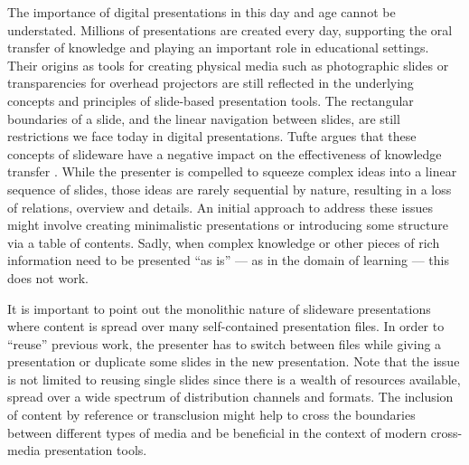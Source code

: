 
    The importance of digital presentations in this day and age cannot be
    understated. Millions of presentations are created every day, supporting
    the oral transfer of knowledge and playing an important role in educational
    settings. Their origins as tools for creating physical media such as
    photographic slides or transparencies for overhead projectors are still
    reflected in the underlying concepts and principles of slide-based
    presentation tools. The rectangular boundaries of a slide, and the linear
    navigation between slides, are still restrictions we face today in digital
    presentations. Tufte argues that these concepts of slideware have a
    negative impact on the effectiveness of knowledge transfer \citep{tufte-1}.
    While the presenter is compelled to squeeze complex ideas into a linear
    sequence of slides, those ideas are rarely sequential by nature, resulting
    in a loss of relations, overview and details. An initial approach to
    address these issues might involve creating minimalistic presentations or
    introducing some structure via a table of contents. Sadly, when complex
    knowledge or other pieces of rich information need to be presented “as is”
    \citep{farkas-1} --- as in the domain of learning --- this does not work.


    It is important to point out the monolithic nature of slideware
    presentations where content is spread over many self-contained presentation
    files. In order to “reuse” previous work, the presenter has to switch
    between files while giving a presentation or duplicate some slides in the
    new presentation. Note that the issue is not limited to reusing single
    slides since there is a wealth of resources available, spread over a wide
    spectrum of distribution channels and formats. The inclusion of content by
    reference or transclusion \citep{nelson-1} might help to cross the
    boundaries between different types of media and be beneficial in the
    context of modern cross-media presentation tools.

